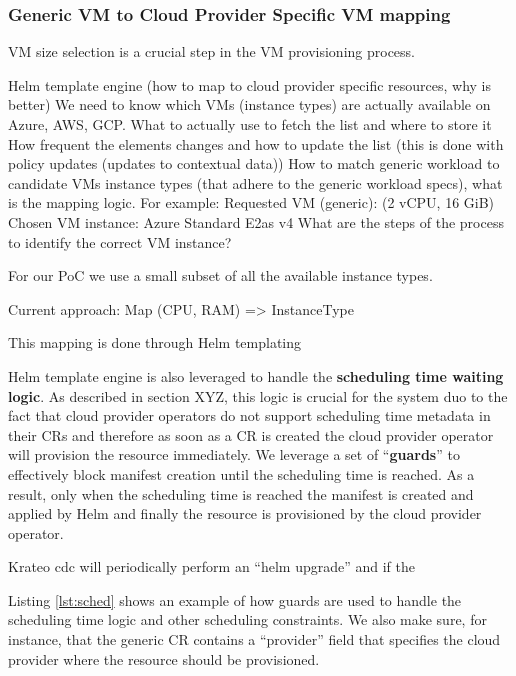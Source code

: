 \subsubsection{Generic VM to Cloud Provider Specific VM mapping}


VM size selection is a crucial step in the VM provisioning process.

Helm template engine (how to map to cloud provider specific resources, why is better)
We need to know which VMs (instance types) are actually available on Azure, AWS, GCP.
What to actually use to fetch the list and where to store it
How frequent the elements changes and how to update the list (this is done with policy updates (updates to contextual data))
How to match generic workload to candidate VMs instance types (that adhere to the generic workload specs), what is the mapping logic.
For example:
Requested VM (generic): (2 vCPU, 16 GiB)
Chosen VM instance: Azure Standard E2as v4
What are the steps of the process to identify the correct VM instance?

For our PoC we use a small subset of all the available instance types.

Current approach:
Map (CPU, RAM) => InstanceType

This mapping is done through Helm templating 








Helm template engine is also leveraged to handle the \textbf{scheduling time waiting logic}.
As described in section XYZ, this logic is crucial for the system duo to the fact that cloud provider operators do not support scheduling time metadata in their CRs and therefore as soon as a CR is created the cloud provider operator will provision the resource immediately.
We leverage a set of ``\textbf{guards}'' to effectively block manifest creation until the scheduling time is reached. 
As a result, only when the scheduling time is reached the manifest is created and applied by Helm and finally the resource is provisioned by the cloud provider operator.


Krateo cdc will periodically perform an ``helm upgrade'' and if the 


Listing \ref{lst:sched} shows an example of how guards are used to handle the scheduling time logic and other scheduling constraints.
We also make sure, for instance, that the generic CR contains a ``provider'' field that specifies the cloud provider where the resource should be provisioned.


